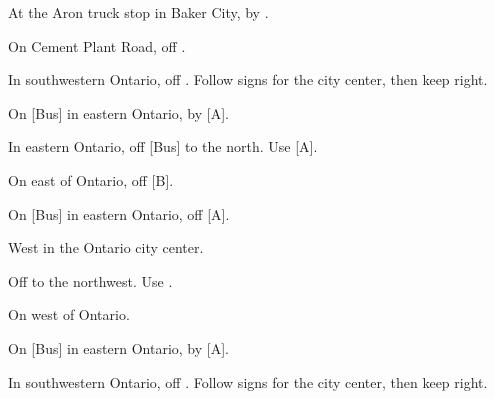 

\begin{LocationList}

At the Aron truck stop in Baker City, by  .

On Cement Plant Road, off  .

In southwestern Ontario, off . Follow signs for the city center, then keep right.

\Location{\GarageHQ \Garage}
On [Bus] in eastern Ontario, by  [A].

In eastern Ontario, off [Bus] to the north. Use  [A].

On  east of Ontario, off  [B].

On [Bus] in eastern Ontario, off  [A].

\Location{\RecruitmentAgency \Recruitment}
West in the Ontario city center.

Off  to the northwest. Use  .

On  west of Ontario.

\Location{\TruckStop \Gas \Rest \Service \Weigh}
On [Bus] in eastern Ontario, by  [A].

In southwestern Ontario, off . Follow signs for the city center, then keep right.

\end{LocationList}
